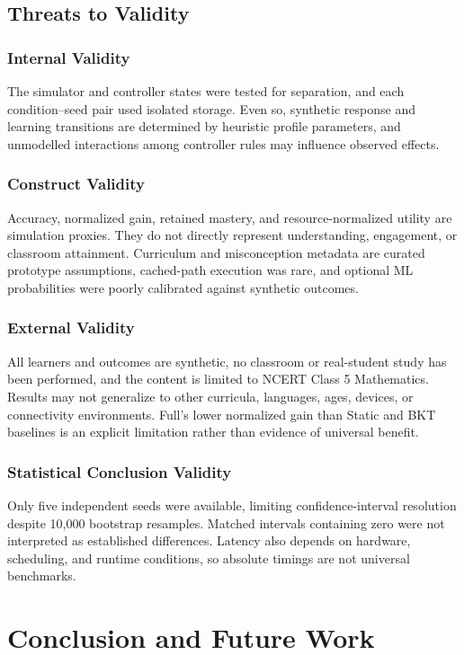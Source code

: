\documentclass[conference]{IEEEtran}
\begin{document}
\subsection{Threats to Validity}

\subsubsection{Internal Validity}
The simulator and controller states were tested for separation, and each
condition--seed pair used isolated storage. Even so, synthetic response and
learning transitions are determined by heuristic profile parameters, and
unmodelled interactions among controller rules may influence observed effects.

\subsubsection{Construct Validity}
Accuracy, normalized gain, retained mastery, and resource-normalized utility
are simulation proxies. They do not directly represent understanding,
engagement, or classroom attainment. Curriculum and misconception metadata are
curated prototype assumptions, cached-path execution was rare, and optional ML
probabilities were poorly calibrated against synthetic outcomes.

\subsubsection{External Validity}
All learners and outcomes are synthetic, no classroom or real-student study has
been performed, and the content is limited to NCERT Class 5 Mathematics.
Results may not generalize to other curricula, languages, ages, devices, or
connectivity environments. Full's lower normalized gain than Static and BKT
baselines is an explicit limitation rather than evidence of universal benefit.

\subsubsection{Statistical Conclusion Validity}
Only five independent seeds were available, limiting confidence-interval
resolution despite 10,000 bootstrap resamples. Matched intervals containing
zero were not interpreted as established differences. Latency also depends on
hardware, scheduling, and runtime conditions, so absolute timings are not
universal benchmarks.

\section{Conclusion and Future Work}
\end{document}
